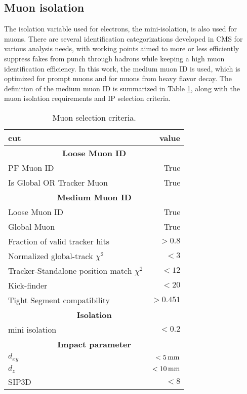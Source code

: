 \subsection*{Muon isolation}
\noindent\justify  
The isolation variable used for electrons, the mini-isolation, is also used for muons. 
\newpara
\noindent\justify  
There are several identification categorizations developed in CMS for various analysis needs, with working points aimed to more or less efficiently suppress fakes from punch through hadrons while keeping a high muon identification efficiency.
In this work, the medium muon ID is used, which is optimized for prompt muons and for muons from heavy flavor decay. 
The definition of the medium muon ID is summarized in Table \ref{tab:muonsID}, along with the muon isolation requirements and IP selection criteria. 
\begin{table}[ht!]
\def\arraystretch{1.2}
    \caption{Muon selection criteria.}
    \label{tab:muonsID}
    \begin{center}
        \begin{tabular}{ l r}
        \hline \hline
        cut         &  value                             \\ \hline
        \multicolumn{2}{c}{\textbf{Loose Muon ID}}                \\
             PF Muon ID                        &  True \\
             Is Global OR Tracker Muon                        &  True \\
        \multicolumn{2}{c}{\textbf{Medium Muon ID}}                \\
             Loose Muon ID                        &  True \\
             Global Muon                         &  True \\
             Fraction of valid tracker hits      &  $>0.8$ \\
             Normalized global-track $\chi^{2}$     &  $<3$ \\
             Tracker-Standalone position match $\chi^{2}$   &  $<12$ \\
             Kick-finder    &   $<20$\\
             Tight Segment compatibility  & $>0.451$\\
        \multicolumn{2}{c}{\textbf{Isolation}}                \\
             mini isolation                 &   $<0.2$                         \\
        \multicolumn{2}{c}{\textbf{Impact parameter}}                \\
        $d_{xy}$ & $<5\,\text{mm}$ \\
        $d_{z} $ & $<10\,\text{mm}$ \\
        SIP3D    & $< 8$ \\
\hline\hline
\end{tabular}
\end{center}
\end{table}                                                                                                      

